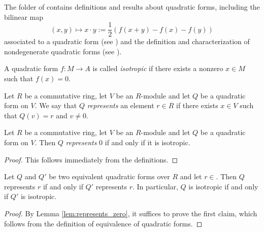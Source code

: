 The  folder of \mathlib contains definitions and results about quadratic forms, including the bilinear map
\[ (x, y) \mapsto x \cdot y := \frac{1}{2}(f(x + y) - f(x) - f(y))\] associated to a quadratic form (see ) and the definition and characterization of nondegenerate quadratic forms (see ).

\begin{definition}\label{def:isotropic}
\leanok
A quadratic form $f : M \to A$ is called \emph{isotropic} if there exists a nonzero $x \in M$ such that $f(x) = 0$.
\end{definition}

\begin{definition}\label{def:represents}
	\leanok
	Let $R$ be a commutative ring, let $V$ be an $R$-module and let $Q$ be a quadratic form on $V$. We say that $Q$ \emph{represents} an element $r \in R$ if there exists $x \in V$ such that $Q(v) = r$ and $v \ne 0$.
\end{definition}

\begin{lemma}\label{lem:represents_zero}
	\leanok
	Let $R$ be a commutative ring, let $V$ be an $R$-module and let $Q$ be a quadratic form on $V$. Then $Q$ \emph{represents} $0$ if and only if it is isotropic.
\end{lemma}
\begin{proof}
	\leanok
	This follows immediately from the definitions.
\end{proof}


\begin{lemma}\label{lem:represents_iff}
\leanok
{}
Let $Q$ and $Q'$ be two equivalent quadratic forms over $R$ and let $r \in $. Then $Q$ represents $r$ if and only if $Q'$ represents $r$. In particular, $Q$ is isotropic if and only if $Q'$ is isotropic.
\end{lemma}

\begin{proof}
\leanok
By Lemma \ref{lem:represents_zero}, it suffices to prove the first claim, which follows from the definition of equivalence of quadratic forms.
\end{proof}

